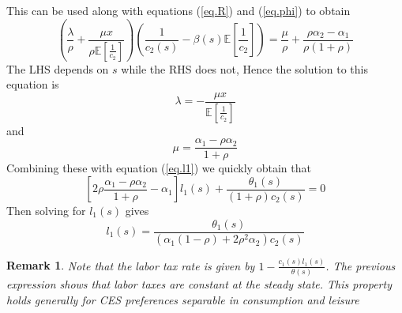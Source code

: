 \documentclass[thmsb,11pt]{article}
\newtheorem{remark}{Remark}
\begin{document}
This can be used along with equations (\ref{eq.R}) and (\ref{eq.phi}) to
obtain
\begin{equation*}
\left(\frac\lambda \rho+\frac{\mu x}{\rho\mathbb{E}[\frac1{c_2}]}%
\right)\left(\frac1{c_2(s)}-\beta(s)\mathbb{E}\left[\frac1{c_2}\right]%
\right) = \frac{\mu}{\rho}+\frac{\rho\alpha_2-\alpha_1}{\rho(1+\rho)}
\end{equation*}
The LHS depends on $s$ while the RHS does not, Hence the solution to
this equation is
\begin{equation}
\lambda = - \frac{\mu x}{\mathbb{E}[\frac1{c_2}]}
\end{equation}%
and
\begin{equation}
\mu = \frac{\alpha_1-\rho\alpha_2}{1+\rho}  \label{eq.mu}
\end{equation}
Combining these with equation (\ref{eq.l1}) we quickly obtain that
\begin{equation*}
\left[2\rho\frac{\alpha_1-\rho\alpha_2}{1+\rho}-\alpha_1\right]%
l_1(s)+\frac{\theta_1(s)}{\left(1+\rho\right)c_2(s)} = 0
\end{equation*}%
Then solving for $l_1(s)$ gives
\begin{equation*}
l_1(s) = \frac{\theta_1(s)}{\left(\alpha_1(1-\rho)+2\rho^2\alpha_2\right)c_2(s)}
\end{equation*}

\begin{remark}
Note that the labor tax rate is given by $1-\frac{c_1(s)l_1(s)}{\theta(s)}$. The previous expression shows that labor taxes are constant at the steady state. This property holds generally for CES preferences separable in consumption and leisure
\end{remark}
\end{document}
